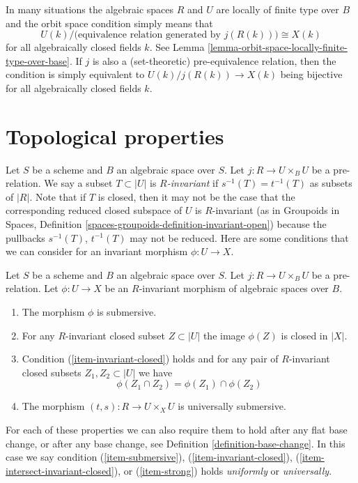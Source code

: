 \noindent
In many situations the algebraic spaces $R$ and $U$ are locally of finite type
over $B$ and the orbit space condition simply means that
$$
U(k)/\big(\text{equivalence relation generated by }j(R(k))\big)
\cong
X(k)
$$
for all algebraically closed fields $k$. See
Lemma \ref{lemma-orbit-space-locally-finite-type-over-base}.
If $j$ is also a (set-theoretic) pre-equivalence relation, then the condition
is simply equivalent to $U(k)/j(R(k)) \to X(k)$ being bijective for all
algebraically closed fields $k$.









\section{Topological properties}
\label{section-topological}

\noindent
Let $S$ be a scheme and $B$ an algebraic space over $S$.
Let $j : R \to U \times_B U$ be a pre-relation.
We say a subset $T \subset |U|$ is {\it $R$-invariant} if
$s^{-1}(T) = t^{-1}(T)$ as subsets of $|R|$.
Note that if $T$ is closed, then it may not be the case that
the corresponding reduced closed subspace of $U$ is $R$-invariant
(as in
Groupoids in Spaces, Definition
\ref{spaces-groupoids-definition-invariant-open})
because the pullbacks $s^{-1}(T)$, $t^{-1}(T)$ may not be reduced.
Here are some conditions that we can consider for an
invariant morphism $\phi : U \to X$.

\begin{definition}
\label{definition-topological}
Let $S$ be a scheme and $B$ an algebraic space over $S$.
Let $j : R \to U \times_B U$ be a pre-relation.
Let $\phi : U \to X$ be an $R$-invariant morphism of algebraic spaces over $B$.
\begin{enumerate}
\item
\label{item-submersive}
The morphism $\phi$ is submersive.
\item
\label{item-invariant-closed}
For any $R$-invariant closed subset $Z \subset |U|$ the image
$\phi(Z)$ is closed in $|X|$.
\item
\label{item-intersect-invariant-closed}
Condition (\ref{item-invariant-closed}) holds and for any pair of
$R$-invariant closed subsets $Z_1, Z_2 \subset |U|$ we have
$$
\phi(Z_1 \cap Z_2) = \phi(Z_1) \cap \phi(Z_2)
$$
\item The morphism $(t, s) : R \to U \times_X U$ is universally submersive.
\label{item-strong}
\end{enumerate}
For each of these properties we can also require them to hold after any
flat base change, or after any base change, see
Definition \ref{definition-base-change}. In this case we say condition
(\ref{item-submersive}),
(\ref{item-invariant-closed}),
(\ref{item-intersect-invariant-closed}), or
(\ref{item-strong}) holds {\it uniformly} or {\it universally}.
\end{definition}








